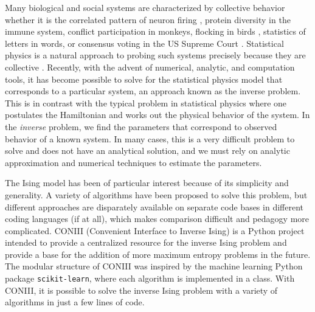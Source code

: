 \documentclass[aps,prl,twocolumn]{revtex4-1}
\begin{document}
Many biological and social systems are characterized by collective behavior whether it is the correlated pattern of neuron firing \cite{Schneidman:2006he}, protein diversity in the immune system, conflict participation in monkeys, flocking in birds \cite{Bialek:2012cs}, statistics of letters in words, or consensus voting in the US Supreme Court \cite{Lee:2015ev}. Statistical physics is a natural approach to probing such systems precisely because they are collective \cite{Castellano:2009ce}.
Recently, with the advent of numerical, analytic, and computation tools, it has become possible to solve for the statistical physics model that corresponds to a particular system, an approach known as the inverse problem.
This is in contrast with the typical problem in statistical physics where one postulates the Hamiltonian and works out the physical behavior of the system. In the \textit{inverse} problem, we  find the parameters that correspond to observed behavior of a known system. In many cases, this is a very difficult problem to solve and does not have an analytical solution, and we must rely on analytic approximation and numerical techniques to estimate the parameters.


The Ising model has been of particular interest because of its simplicity and generality. A variety of algorithms have been proposed to solve this problem, but different approaches are disparately available on separate code bases in different coding languages (if at all), which makes comparison difficult and pedagogy more complicated.
CONIII (Convenient Interface to Inverse Ising) is a Python project intended to provide a centralized resource for the inverse Ising problem and provide a base for the addition of more maximum entropy problems in the future. 
The modular structure of CONIII was inspired by the machine learning Python package {\tt scikit-learn}, where each algorithm is implemented in a class.
With CONIII, it is possible to solve the inverse Ising problem with a variety of algorithms in just a few lines of code.
\end{document}

